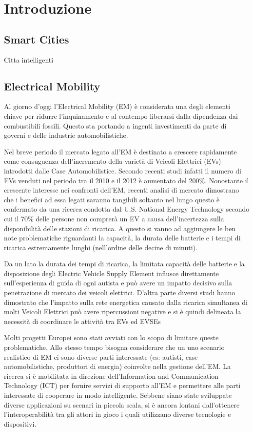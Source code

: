 \chapter{Introduzione}

\section{Smart Cities}
Citta intelligenti

\section{Electrical Mobility}

Al giorno d'oggi l'Electrical Mobility (EM) è considerata una degli elementi chiave per ridurre l'inquinamento 
e al contempo liberarsi dalla dipendenza dai combustibili fossili. Questo sta portando a ingenti investimenti
da parte di governi e delle industrie automobilistiche. 

Nel breve periodo il mercato legato all'EM è destinato a crescere rapidamente come  
consuguenza dell'incremento della varietà di Veicoli Elettrici (EVs) introdotti dalle Case Automobilistice. 
Secondo recenti studi infatti il numero di EVs venduti nel periodo tra il 2010 e il 2012 è aumentato del 200\%.
Nonostante il crescente interesse nei confronti dell'EM, recenti analisi di mercato dimostrano
che i benefici ad essa legati saranno tangibili soltanto nel lungo questo è confermato da una ricerca condotta dal 
U.S. National Energy Technology secondo cui il 70\% delle persone non comprerà un EV a causa 
dell'incertezza sulla disponibilità delle stazioni di ricarica. A questo si vanno ad aggiungere le
ben note problematiche riguardanti la capacità, la durata delle batterie e i tempi di ricarica 
estremamente lunghi (nell'ordine delle decine di minuti).

Da un lato la durata dei tempi di ricarica, la limitata capacità delle batterie e la disposizione
degli Electric Vehicle Supply Element influsce direttamente sull'esperienza di guida di ogni autista 
e può avere un impatto decisivo sulla penetrazione di mercato dei veicoli elettrici.
D'altra parte diversi studi hanno dimostrato che l'impatto sulla rete energetica causato dalla
ricarica simultanea di molti Veicoli Elettrici può avere ripercussioni negative e si è 
quindi delineata la necessità di coordinare le attività tra EVs ed EVSEs 

Molti progetti Europei sono stati avviati con lo scopo di limitare queste problematiche. Allo stesso tempo
bisogna considerare che un uno scenario realistico di EM ci sono diverse parti interessate
(es: autisti, case automobilistiche, produttori di energia) coinvolte nella gestione dell'EM.
La ricerca si è mobilitata in direzione dell'Information and Communication Technology (ICT)
per fornire servizi di supporto all'EM e permettere alle parti interessate di cooperare in modo intelligente.
Sebbene siano state sviluppate diverse applicazioni su scenari in piccola scala, si è ancora lontani
dall'ottenere l'interoperabilità tra gli attori in gioco i quali utilizzano diverse tecnologie e dispositivi.

